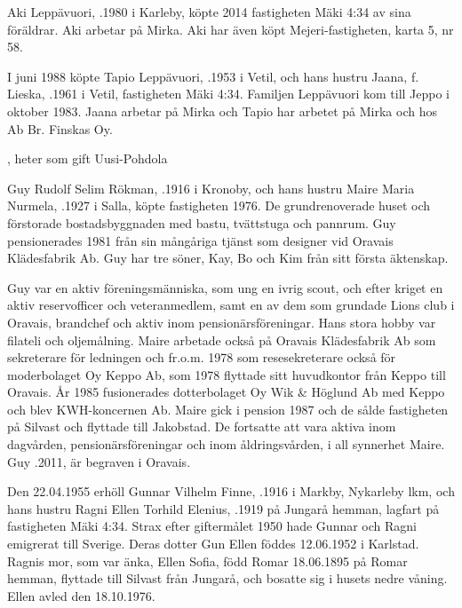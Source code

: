 


Aki Leppävuori, .1980 i Karleby, köpte 2014 fastigheten Mäki 4:34 av sina föräldrar. Aki arbetar på Mirka. Aki har även köpt Mejeri-fastigheten, karta 5, nr 58.\jhvspace{}


I juni 1988 köpte Tapio Leppävuori, .1953 i Vetil, och	hans hustru Jaana, f. Lieska, .1961 i Vetil, fastigheten Mäki 4:34. Familjen Leppävuori kom till Jeppo i oktober 1983. Jaana arbetar på Mirka och Tapio har arbetet på Mirka och hos Ab Br. Finskas Oy.
\begin{jhchildren}
  \item {}
  \item {}, heter som gift Uusi-Pohdola
\end{jhchildren}


Guy Rudolf Selim Rökman, .1916 i Kronoby, och hans hustru Maire Maria Nurmela, .1927 i Salla, köpte fastigheten 1976. De grundrenoverade huset och förstorade bostadsbyggnaden med bastu, tvättstuga och pannrum. Guy pensionerades 1981 från sin mångåriga tjänst som designer vid Oravais Klädesfabrik Ab. Guy har tre söner, Kay, Bo och Kim från sitt första äktenskap.

Guy var en aktiv föreningsmänniska, som ung en ivrig scout, och efter kriget en aktiv reservofficer och veteranmedlem, samt en av dem som 	grundade Lions club i Oravais, brandchef och aktiv inom pensionärsföreningar. Hans stora hobby var filateli och oljemålning.	Maire arbetade också på Oravais Klädesfabrik Ab som sekreterare för ledningen och fr.o.m. 1978 som resesekreterare också för moderbolaget Oy Keppo Ab, som 1978 flyttade sitt huvudkontor från Keppo till Oravais. År 1985 fusionerades dotterbolaget Oy Wik \& Höglund Ab med Keppo och blev KWH-koncernen Ab. Maire gick i pension 1987 och de sålde fastigheten på Silvast och flyttade till Jakobstad. De fortsatte att vara aktiva inom	dagvården, pensionärsföreningar och inom åldringsvården, i all synnerhet Maire. Guy .2011, är begraven i Oravais.


Den 22.04.1955 erhöll Gunnar Vilhelm Finne, .1916 i Markby, Nykarleby lkm, och hans hustru Ragni Ellen Torhild Elenius, .1919 på Jungarå hemman, lagfart på fastigheten Mäki 4:34. Strax efter giftermålet 1950 hade Gunnar och Ragni emigrerat till Sverige. Deras dotter Gun Ellen föddes 12.06.1952 i Karlstad. Ragnis mor, som var änka, Ellen Sofia, född Romar 18.06.1895 på Romar hemman, flyttade till Silvast från Jungarå, och bosatte sig i husets nedre våning. Ellen avled den 18.10.1976.

